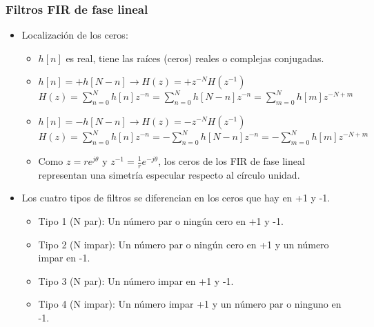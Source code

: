 \documentclass[handout]{beamer}
\numberwithin{section}{part}
\begin{document}
\begin{frame}
  \frametitle{Filtros FIR de fase lineal}
  \footnotesize
  \begin{itemize}
    \item Localización de los ceros:
    \begin{itemize}
    \footnotesize
    \item $h[n]$ es real, tiene las raíces (ceros) reales o complejas conjugadas.
    \vspace{0.1cm}  
    \item \color{blue}$h[n]=+h[N-n] \rightarrow H(z)=+z^{-N}H(z^{-1})$\color{black}\\
    \vspace{0.1cm}
    {\scriptsize\color{teal} $H(z)=\sum_{n=0}^N h[n]z^{-n}=\sum_{n=0}^N h[N-n]z^{-n}=\sum_{m=0}^N h[m]z^{-N+m}$}\\
    \vspace{0.1cm}
    \item \color{blue}$h[n]=-h[N-n] \rightarrow H(z)=-z^{-N}H(z^{-1})$\color{black}\\
    \vspace{0.1cm}    
    {\scriptsize\color{teal} $H(z)=\sum_{n=0}^N h[n]z^{-n}=-\sum_{n=0}^N h[N-n]z^{-n}=-\sum_{m=0}^N h[m]z^{-N+m}$}

    \vspace{0.2cm}
    \item Como $z=re^{j\theta}$ y $z^{-1}=\frac{1}{r}e^{-j\theta}$, los ceros de los FIR de fase lineal representan una simetría especular respecto al círculo unidad.
    
    \end{itemize}
    \item Los cuatro tipos de filtros se diferencian en los ceros que hay en +1 y -1.
    \begin{itemize}
      \scriptsize
      \item \alert{Tipo 1 (N par): Un número par o ningún cero en +1 y -1.}
      \item \alert{Tipo 2 (N impar): Un número par o ningún cero en +1 y un número impar en -1.}
      \item \alert{Tipo 3 (N par): Un número impar en +1 y -1.}
      \item \alert{Tipo 4 (N impar): Un número impar +1 y un número par o ninguno en -1.}
    \end{itemize}
  \end{itemize}
\end{frame}
  
\end{document}
